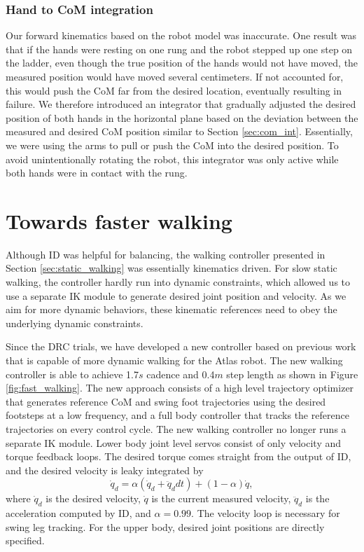 \documentclass{ws-ijhr}
\newcommand{\fref}[1] {Figure \ref{#1}}
\newcommand{\sref}[1] {Section \ref{#1}}
\begin{document}
\subsubsection{Hand to CoM integration}
Our forward kinematics based on the robot model was inaccurate. 
One result was that if the hands were resting on one rung and the robot stepped
up one step on the ladder, even though the true position of the hands would not
have moved, the measured position would have moved several centimeters. 
If not accounted for, this would push the CoM far from the desired location, 
eventually resulting in failure. 
We therefore introduced an integrator that gradually adjusted the desired position
of both hands in the horizontal plane based on the deviation between the measured 
and desired CoM position similar to \sref{sec:com_int}. 
Essentially, we were using the arms to pull or push the CoM into the desired 
position. 
To avoid unintentionally rotating the robot, this integrator was only active 
while both hands were in contact with the rung. 

\section{Towards faster walking}
\label{sec:new_stuff}
Although ID was helpful for balancing, the walking controller presented in 
\sref{sec:static_walking} was essentially kinematics driven. 
For slow static walking, the controller hardly run into dynamic constraints, 
which allowed us to use a separate IK module to generate desired joint 
position and velocity. 
As we aim for more dynamic behaviors, these kinematic references need to obey
the underlying dynamic constraints. 

Since the DRC trials, we have developed a new controller based on previous 
work \cite{sfeng_online,sfeng_proposal} that is capable of more dynamic walking
for the Atlas robot. 
The new walking controller is able to achieve 1.7$s$ cadence and 0.4$m$
step length as shown in \fref{fig:fast_walking}. 
The new approach consists of a high level trajectory optimizer that generates
reference CoM and swing foot trajectories using the desired footsteps at a low
frequency, and a full body controller that tracks the reference trajectories 
on every control cycle. 
The new walking controller no longer runs a separate IK module. 
Lower body joint level servos consist of only velocity and torque feedback 
loops. 
The desired torque comes straight from the output of ID, and the desired 
velocity is leaky integrated by
\begin{equation}
  \dot{q}_d = \alpha (\dot{q}_d + \ddot{q}_d dt) + (1-\alpha) \dot{q},
	\label{eq:qd_int}
\end{equation} 
where $\dot{q}_d$ is the desired velocity, $\dot{q}$ is the current 
measured velocity, $\ddot{q}_d$ is the acceleration computed by ID, and $\alpha = 0.99$. 
The velocity loop is necessary for swing leg tracking. 
For the upper body, desired joint positions are directly specified.
\end{document}
